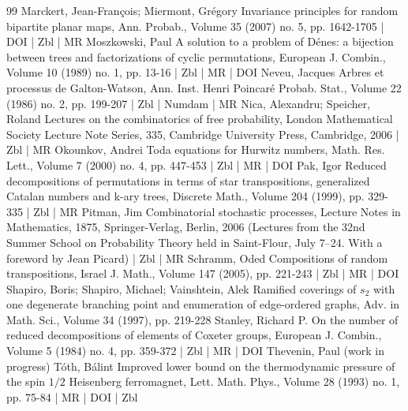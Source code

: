 \begin{thebibliography}{99}
Marckert, Jean-François; Miermont, Grégory Invariance principles for random bipartite planar maps, Ann. Probab., Volume 35 (2007) no. 5, pp. 1642-1705 | DOI | Zbl | MR
Moszkowski, Paul A solution to a problem of Dénes: a bijection between trees and factorizations of cyclic permutations, European J. Combin., Volume 10 (1989) no. 1, pp. 13-16 | Zbl | MR | DOI
Neveu, Jacques Arbres et processus de Galton-Watson, Ann. Inst. Henri Poincaré Probab. Stat., Volume 22 (1986) no. 2, pp. 199-207 | Zbl | Numdam | MR
Nica, Alexandru; Speicher, Roland Lectures on the combinatorics of free probability, London Mathematical Society Lecture Note Series, 335, Cambridge University Press, Cambridge, 2006 | Zbl | MR
Okounkov, Andrei Toda equations for Hurwitz numbers, Math. Res. Lett., Volume 7 (2000) no. 4, pp. 447-453 | Zbl | MR | DOI
Pak, Igor Reduced decompositions of permutations in terms of star transpositions, generalized Catalan numbers and k-ary trees, Discrete Math., Volume 204 (1999), pp. 329-335 | Zbl | MR
Pitman, Jim Combinatorial stochastic processes, Lecture Notes in Mathematics, 1875, Springer-Verlag, Berlin, 2006 (Lectures from the 32nd Summer School on Probability Theory held in Saint-Flour, July 7–24. With a foreword by Jean Picard) | Zbl | MR
Schramm, Oded Compositions of random transpositions, Israel J. Math., Volume 147 (2005), pp. 221-243 | Zbl | MR | DOI
Shapiro, Boris; Shapiro, Michael; Vainshtein, Alek Ramified coverings of $s_2$ with one degenerate branching point and enumeration of edge-ordered graphs, Adv. in Math. Sci., Volume 34 (1997), pp. 219-228
Stanley, Richard P. On the number of reduced decompositions of elements of Coxeter groups, European J. Combin., Volume 5 (1984) no. 4, pp. 359-372 | Zbl | MR | DOI
Thevenin, Paul (work in progress)
Tóth, Bálint Improved lower bound on the thermodynamic pressure of the spin $1/2$ Heisenberg ferromagnet, Lett. Math. Phys., Volume 28 (1993) no. 1, pp. 75-84 | MR | DOI | Zbl
\end{thebibliography}

